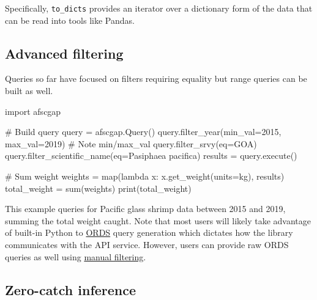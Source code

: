 \documentclass[
  letterpaper,
  oneside,
  open=any]{scrbook}
\newenvironment{Shaded}{\begin{snugshade}}{\end{snugshade}}
\newcommand{\AttributeTok}[1]{\textcolor[rgb]{0.40,0.45,0.13}{#1}}
\newcommand{\CommentTok}[1]{\textcolor[rgb]{0.37,0.37,0.37}{#1}}
\newcommand{\DecValTok}[1]{\textcolor[rgb]{0.68,0.00,0.00}{#1}}
\newcommand{\FunctionTok}[1]{\textcolor[rgb]{0.28,0.35,0.67}{#1}}
\newcommand{\NormalTok}[1]{\textcolor[rgb]{0.00,0.23,0.31}{#1}}
\newcommand{\OtherTok}[1]{\textcolor[rgb]{0.00,0.23,0.31}{#1}}
\newcommand{\SpecialCharTok}[1]{\textcolor[rgb]{0.37,0.37,0.37}{#1}}
\newcommand{\StringTok}[1]{\textcolor[rgb]{0.13,0.47,0.30}{#1}}
\begin{document}
Specifically, \texttt{to\_dicts} provides an iterator over a dictionary
form of the data that can be read into tools like Pandas.

\subsection{Advanced filtering}\label{advanced-filtering}

Queries so far have focused on filters requiring equality but range
queries can be built as well.

\begin{Shaded}
\begin{Highlighting}[]
\NormalTok{import afscgap}

\CommentTok{\# Build query}
\NormalTok{query }\OtherTok{=} \FunctionTok{afscgap.Query}\NormalTok{()}
\FunctionTok{query.filter\_year}\NormalTok{(}\AttributeTok{min\_val=}\DecValTok{2015}\NormalTok{, }\AttributeTok{max\_val=}\DecValTok{2019}\NormalTok{)   }\CommentTok{\# Note min/max\_val}
\FunctionTok{query.filter\_srvy}\NormalTok{(}\AttributeTok{eq=}\StringTok{\textquotesingle{}GOA\textquotesingle{}}\NormalTok{)}
\FunctionTok{query.filter\_scientific\_name}\NormalTok{(}\AttributeTok{eq=}\StringTok{\textquotesingle{}Pasiphaea pacifica\textquotesingle{}}\NormalTok{)}
\NormalTok{results }\OtherTok{=} \FunctionTok{query.execute}\NormalTok{()}

\CommentTok{\# Sum weight}
\NormalTok{weights }\OtherTok{=} \FunctionTok{map}\NormalTok{(lambda x}\SpecialCharTok{:} \FunctionTok{x.get\_weight}\NormalTok{(}\AttributeTok{units=}\StringTok{\textquotesingle{}kg\textquotesingle{}}\NormalTok{), results)}
\NormalTok{total\_weight }\OtherTok{=} \FunctionTok{sum}\NormalTok{(weights)}
\FunctionTok{print}\NormalTok{(total\_weight)}
\end{Highlighting}
\end{Shaded}

This example queries for Pacific glass shrimp data between 2015 and
2019, summing the total weight caught. Note that most users will likely
take advantage of built-in Python to
\href{https://www.oracle.com/database/technologies/appdev/rest.html}{ORDS}
query generation which dictates how the library communicates with the
API service. However, users can provide raw ORDS queries as well using
\href{https://pyafscgap.org/devdocs/afscgap.html\#manual-filtering}{manual
filtering}.

\subsection{Zero-catch inference}\label{zero-catch-inference}
\end{document}
